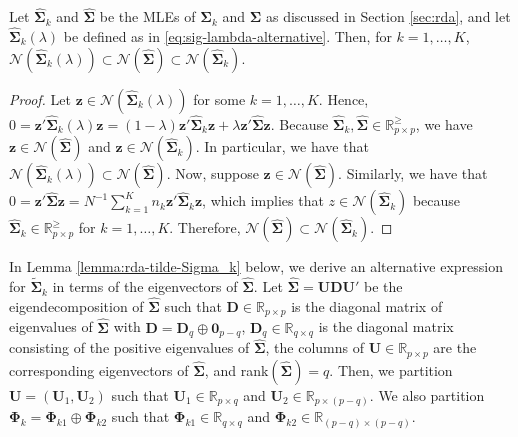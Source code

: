 \documentclass[11pt]{article}
\begin{document}
\begin{lemma}\label{lemma:null-spaces}
Let $\widehat{\bm \Sigma}_k$ and $\widehat{\bm \Sigma}$ be the MLEs of $\bm \Sigma_k$ and $\bm \Sigma$ as discussed in Section \ref{sec:rda}, and let $\widehat{\bm \Sigma}_k(\lambda)$ be defined as in \eqref{eq:sig-lambda-alternative}. Then, for $k = 1, \ldots, K$, $\mathcal{N}(\widehat{\bm \Sigma}_k(\lambda)) \subset \mathcal{N}(\widehat{\bm \Sigma}) \subset \mathcal{N}(\widehat{\bm \Sigma}_k)$.
\end{lemma}
\begin{proof}
Let $\bm z \in \mathcal{N}(\widehat{\bm \Sigma}_k(\lambda))$ for some $k = 1, \ldots, K$. Hence, $0 = \bm z' \widehat{\bm \Sigma}_k(\lambda) \bm z = (1 - \lambda) \bm z' \widehat{\bm \Sigma}_k \bm z + \lambda \bm z' \widehat{\bm \Sigma} \bm z$. Because $\widehat{\bm \Sigma}_k, \widehat{\bm \Sigma}\in \mathbb{R}_{p \times p}^{\ge}$, we have $\bm z \in \mathcal{N}(\widehat{\bm \Sigma})$ and $\bm z \in \mathcal{N}(\widehat{\bm \Sigma}_k)$. In particular, we have that $\mathcal{N}(\widehat{\bm \Sigma}_k(\lambda)) \subset \mathcal{N}(\widehat{\bm \Sigma})$. Now, suppose $\bm z \in \mathcal{N}(\widehat{\bm \Sigma})$. Similarly, we have that $0 = \bm z' \widehat{\bm \Sigma} \bm z = N^{-1} \sum_{k = 1}^K n_k \bm z' \widehat{\bm \Sigma}_k \bm z$, which implies that $z \in \mathcal{N}(\widehat{\bm \Sigma}_k)$ because $\widehat{\bm \Sigma}_k \in \mathbb{R}_{p \times p}^{\ge}$ for $k = 1, \ldots, K$. Therefore, $\mathcal{N}(\widehat{\bm \Sigma}) \subset \mathcal{N}(\widehat{\bm \Sigma}_k)$.
\end{proof}

In Lemma \ref{lemma:rda-tilde-Sigma_k} below, we derive an alternative expression for $\tilde{\bm \Sigma}_k$ in terms of the eigenvectors of $\widehat{\bm \Sigma}$. Let $\widehat{\bm \Sigma} = \bm U \bm D \bm U'$ be the eigendecomposition of $\widehat{\bm \Sigma}$ such that $\bm D \in \mathbb{R}_{p \times p}$ is the diagonal matrix of eigenvalues of $\widehat{\bm \Sigma}$ with $\bm D = \bm D_q \oplus \bm 0_{p-q}$, $\bm D_q \in \mathbb{R}_{q \times q}$ is the diagonal matrix consisting of the positive eigenvalues of $\widehat{\bm \Sigma}$,  the columns of $\bm U \in \mathbb{R}_{p \times p}$ are the corresponding eigenvectors of $\widehat{\bm \Sigma}$, and rank$(\widehat{\bm \Sigma}) = q$. Then, we partition $\bm U = (\bm U_1, \bm U_2)$ such that $\bm U_1 \in \mathbb{R}_{p \times q}$ and $\bm U_2 \in \mathbb{R}_{p \times (p - q)}$. We also partition $\bm \Phi_k = \bm \Phi_{k1} \oplus \bm \Phi_{k2}$ such that $\bm \Phi_{k1} \in \mathbb{R}_{q \times q}$ and $\bm \Phi_{k2} \in \mathbb{R}_{(p-q) \times (p-q)}$.
\end{document}
